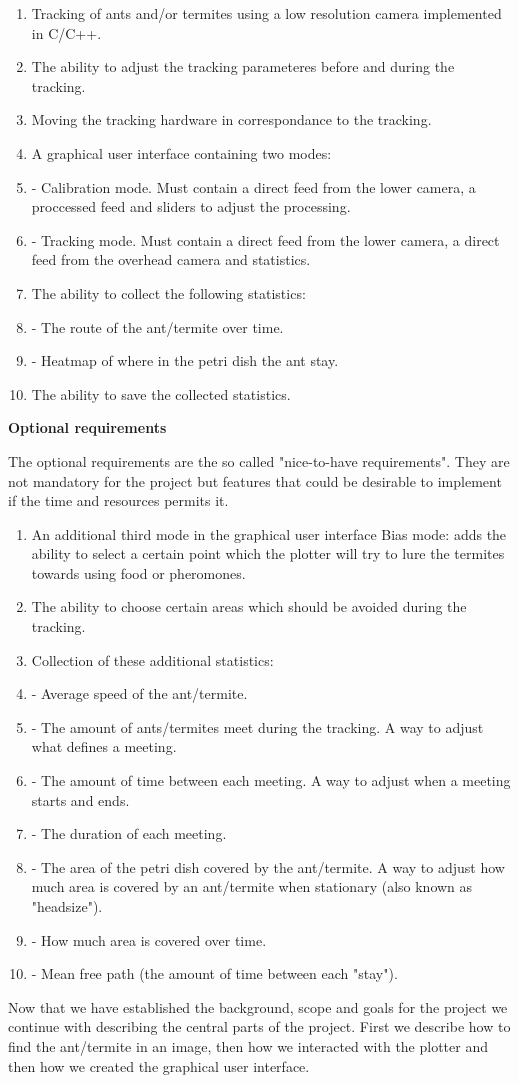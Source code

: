 \begin{enumerate}
    \item Tracking of ants and/or termites using a low resolution camera implemented in C/C++.
    \item The ability to adjust the tracking parameteres before and during the tracking.
    \item Moving the tracking hardware in correspondance to the tracking.
	\item A graphical user interface containing two modes:
    \item - Calibration mode. Must contain a direct feed from the lower camera, a proccessed feed and sliders to adjust the processing.
    \item - Tracking mode. Must contain a direct feed from the lower camera, a direct feed from the overhead camera and statistics.
    \item The ability to collect the following statistics:
    \item - The route of the ant/termite over time. 
    \item - Heatmap of where in the petri dish the ant stay.
    \item The ability to save the collected statistics.
\end{enumerate}

\noindent \textbf{Optional requirements} \par
The optional requirements are the so called "nice-to-have requirements". They are not mandatory for the project but features that could be desirable to implement if the time and resources permits it.

\begin{enumerate}
	\item An additional third mode in the graphical user interface Bias mode: adds the ability to select a certain point which the plotter will try to lure the termites towards using food or pheromones.
    \item The ability to choose certain areas which should be avoided during the tracking.
    \item Collection of these additional statistics:
    \item - Average speed of the ant/termite.
    \item - The amount of ants/termites meet during the tracking. A way to adjust what defines a meeting.
    \item - The amount of time between each meeting. A way to adjust when a meeting starts and ends.
    \item - The duration of each meeting.
    \item - The area of the petri dish covered by the ant/termite. A way to adjust how much area is covered by an ant/termite when stationary (also known as "headsize").
    \item - How much area is covered over time.
    \item - Mean free path (the amount of time between each "stay").
\end{enumerate}

Now that we have established the background, scope and goals for the project we continue with describing the central parts of the project. First we describe how to find the ant/termite in an image, then how we interacted with the plotter and then how we created the graphical user interface.
